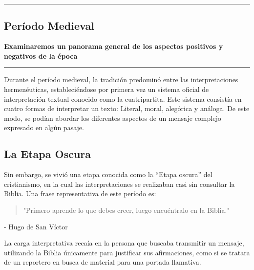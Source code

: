 {\color{gray}\hrule}
\begin{center}
\section{Período Medieval}
\textbf{Examinaremos un panorama general de los aspectos positivos y negativos de la época}
\end{center}
{\color{gray}\hrule}
\begin{multicols}{2}

Durante el período medieval, la tradición predominó entre las interpretaciones hermenéuticas, estableciéndose por primera vez un sistema oficial de interpretación textual conocido como la cuatripartita. Este sistema consistía en cuatro formas de interpretar un texto: Literal, moral, alegórica y análoga. De este modo, se podían abordar los diferentes aspectos de un mensaje complejo expresado en algún pasaje.

\subsection{La Etapa Oscura}

Sin embargo, se vivió una etapa conocida como la ``Etapa oscura'' del cristianismo, en la cual las interpretaciones se realizaban casi sin consultar la Biblia. Una frase representativa de este período es:

\begin{quote}
"Primero aprende lo que debes creer, luego encuéntralo en la Biblia."
\end{quote}
\begin{flushright}
- Hugo de San Víctor
\end{flushright}

La carga interpretativa recaía en la persona que buscaba transmitir un mensaje, utilizando la Biblia únicamente para justificar sus afirmaciones, como si se tratara de un reportero en busca de material para una portada llamativa.

\end{multicols}
